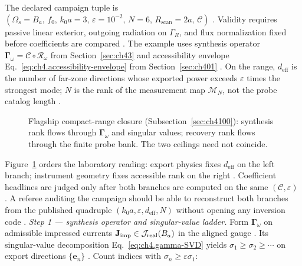 The declared campaign tuple is $(\Omega_{s}=B_{a},\,f_{0},\,k_{0}a=3,\,\varepsilon=10^{-2},\,N=6,\,R_{\mathrm{scan}}=2a,\,\mathcal{C})$ . Validity requires passive linear exterior, outgoing radiation on $\Gamma_{R}$, and flux normalization fixed before coefficients are compared . The example uses synthesis operator $\boldsymbol{\Gamma}_\omega=\mathcal{C}\circ\mathcal{R}_\omega$ from Section~\ref{sec:ch43} and accessibility envelope Eq.~\eqref{eq:ch4.accessibility-envelope} from Section~\ref{sec:ch401} . On the range, $d_{\mathrm{eff}}$ is the number of far-zone directions whose exported power exceeds $\varepsilon$ times the strongest mode; $N$ is the rank of the measurement map $\mathcal{M}_{N}$, not the probe catalog length .
\begin{figure}[t]
\centering
{}
\caption{Flagship compact-range closure (Subsection~\ref{sec:ch4100}): synthesis rank flows through $\boldsymbol{\Gamma}_\omega$ and singular values; recovery rank flows through the finite probe bank. The two ceilings need not coincide.}
\label{fig:ch4.flagship-compact-range}
\end{figure}
Figure~\ref{fig:ch4.flagship-compact-range} orders the laboratory reading: export physics fixes $d_{\mathrm{eff}}$ on the left branch; instrument geometry fixes accessible rank on the right . Coefficient headlines are judged only after both branches are computed on the same $(\mathcal{C},\varepsilon)$ . A referee auditing the campaign should be able to reconstruct both branches from the published quadruple $(k_{0}a,\varepsilon,d_{\mathrm{eff}},N)$ without opening any inversion code .
\emph{Step 1 --- synthesis operator and singular-value ladder.} Form $\boldsymbol{\Gamma}_\omega$ on admissible impressed currents $\mathbf{J}_{\mathrm{imp}}\in\mathcal{J}_{\mathrm{real}}(B_{a})$ in the aligned gauge . Its singular-value decomposition Eq.~\eqref{eq:ch4.gamma-SVD} yields $\sigma_{1}\ge\sigma_{2}\ge\cdots$ on export directions $\{\mathbf{e}_{n}\}$ . Count indices with $\sigma_{n}\ge\varepsilon\sigma_{1}$:
